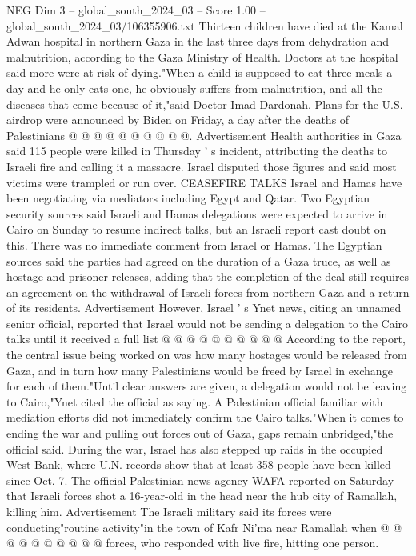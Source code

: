 \begin{textsample}{NEG Dim 3 – global\_south\_2024\_03 – Score 1.00 – global\_south\_2024\_03/106355906.txt}
Thirteen children have died at the Kamal Adwan hospital in northern Gaza in the last three days from dehydration and malnutrition, according to the Gaza Ministry of Health.
Doctors at the hospital said more were at risk of dying."When a child is supposed to eat three meals a day and he only eats one, he obviously suffers from malnutrition, and all the diseases that come because of it,"said Doctor Imad Dardonah.
Plans for the U.S. airdrop were announced by Biden on Friday, a day after the deaths of Palestinians @ @ @ @ @ @ @ @ @ @.
Advertisement Health authorities in Gaza said 115 people were killed in Thursday ' s incident, attributing the deaths to Israeli fire and calling it a massacre.
Israel disputed those figures and said most victims were trampled or run over.
CEASEFIRE TALKS Israel and Hamas have been negotiating via mediators including Egypt and Qatar.
Two Egyptian security sources said Israeli and Hamas delegations were expected to arrive in Cairo on Sunday to resume indirect talks, but an Israeli report cast doubt on this.
There was no immediate comment from Israel or Hamas.
The Egyptian sources said the parties had agreed on the duration of a Gaza truce, as well as hostage and prisoner releases, adding that the completion of the deal still requires an agreement on the withdrawal of Israeli forces from northern Gaza and a return of its residents.
Advertisement However, Israel ' s Ynet news, citing an unnamed senior official, reported that Israel would not be sending a delegation to the Cairo talks until it received a full list @ @ @ @ @ @ @ @ @ @ According to the report, the central issue being worked on was how many hostages would be released from Gaza, and in turn how many Palestinians would be freed by Israel in exchange for each of them."Until clear answers are given, a delegation would not be leaving to Cairo,"Ynet cited the official as saying.
A Palestinian official familiar with mediation efforts did not immediately confirm the Cairo talks."When it comes to ending the war and pulling out forces out of Gaza, gaps remain unbridged,"the official said.
During the war, Israel has also stepped up raids in the occupied West Bank, where U.N. records show that at least 358 people have been killed since Oct. 7.
The official Palestinian news agency WAFA reported on Saturday that Israeli forces shot a 16-year-old in the head near the hub city of Ramallah, killing him.
Advertisement The Israeli military said its forces were conducting"routine activity"in the town of Kafr Ni'ma near Ramallah when @ @ @ @ @ @ @ @ @ @ forces, who responded with live fire, hitting one person.

\end{textsample}
